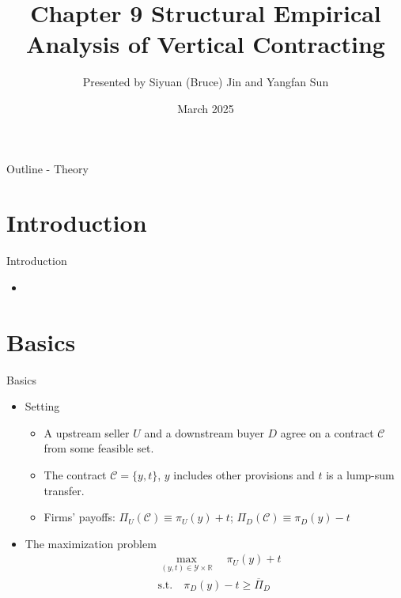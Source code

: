 \documentclass[aspectratio=169]{beamer}  %
\title{Chapter 9 Structural Empirical Analysis of Vertical Contracting}
\author{Presented by Siyuan (Bruce) Jin and Yangfan Sun}
\institute{Hong Kong University of Science and Technology}
\date{March 2025}
\begin{document}
\begin{frame}[plain]
    \titlepage
\end{frame}

\begin{frame}{Outline - Theory}
    \tableofcontents
\end{frame}

\section{Introduction}
\begin{frame}{Introduction}
    \begin{itemize}
        \item 
    \end{itemize}
\end{frame}

\section{Basics}
\begin{frame}{Basics}
    \begin{itemize}
        \item Setting \vspace{.2cm}
        \begin{itemize}
            \item A upstream seller $U$ and a downstream buyer $D$ agree on a contract $\mathcal{C}$ from some feasible set. \vspace{.2cm}
            \item The contract $\mathcal{C} = \{y, t\}$, $y$ includes other provisions and $t$ is a lump-sum transfer. \vspace{.2cm}
            \item Firms' payoffs: $\Pi_U(\mathcal{C})\equiv \pi_U(y) + t$; $\Pi_D(\mathcal{C})\equiv \pi_D(y) - t$ \vspace{.2cm}
        \end{itemize}
        \item The maximization problem \vspace{.2cm}
        \begin{equation}
            \begin{aligned}
            & \max_{(y, t) \in \mathcal{Y} \times \mathbb{R}} \quad \pi_U(y) + t \\
            & \text{s.t.} \quad \pi_D(y) - t \geq \overline{\Pi}_D
            \end{aligned}
            \end{equation}
    \end{itemize}
\end{frame}
\end{document}
